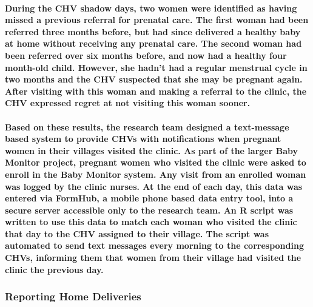 \paragraph{During the CHV shadow days, two women were identified as having missed a previous referral for prenatal care. The first woman had been referred three months before, but had since delivered a healthy baby at home without receiving any prenatal care. The second woman had been referred over six months before, and now had a healthy four month-old child. However, she hadn’t had a regular menstrual cycle in two months and the CHV suspected that she may be pregnant again. After visiting with this woman and making a referral to the clinic, the CHV expressed regret at not visiting this woman sooner. }

\paragraph{Based on these results, the research team designed a text-message based system to provide CHVs with notifications when pregnant women in their villages visited the clinic.  As part of the larger Baby Monitor project, pregnant women who visited the clinic were asked to enroll in the Baby Monitor system. Any visit from an enrolled woman was logged by the clinic nurses. At the end of each day, this data was entered via FormHub, a mobile phone based data entry tool, into a secure server accessible only to the research team. An R script was written to use this data to match each woman who visited the clinic that day to the CHV assigned to their village. The script was automated to send text messages every morning to the corresponding CHVs, informing them that women from their village had visited the clinic the previous day.}

\subsubsection{Reporting Home Deliveries}
